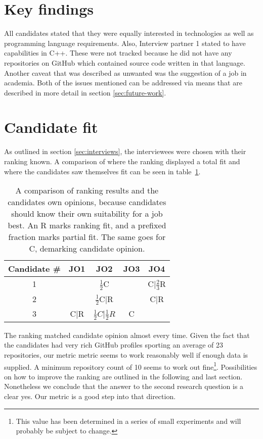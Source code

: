 \section{Key findings}\label{sec:key-findings}
All candidates stated that they were equally interested in technologies as well as programming language requirements. Also, Interview partner 1 stated to have capabilities in C++. These were not tracked because he did not have any repositories on GitHub which contained source code written in that language. Another caveat that was described as unwanted was the suggestion of a job in academia. Both of the issues mentioned can be addressed via means that are described in more detail in section \ref{sec:future-work}.

\section{Candidate fit}
As outlined in section \ref{sec:interviews}, the interviewees were chosen with their ranking known. A comparison of where the ranking displayed a total fit and where the candidates saw themselves fit can be seen in table~\ref{table:rank-comparison}.

\begin{table}
\centering
\begin{tabular}{c|cccc}
Candidate \# & JO1 & JO2 & JO3 & JO4\\
\hline
           1 & & $\frac{1}{2}$C & & C|$\frac{2}{3}$R\\
           2 & & $\frac{1}{2}$C|R & & C|R\\
           3 & C|R & $\frac{1}{2}C$|$\frac{1}{2}R$ & C & \\
\end{tabular}
\caption{A comparison of ranking results and the candidates own opinions, because candidates should know their own suitability for a job best. An R marks ranking fit, and a prefixed fraction marks partial fit. The same goes for C, demarking candidate opinion.}
\label{table:rank-comparison}
\end{table}

The ranking matched candidate opinion almost every time. Given the fact that the candidates had very rich GitHub profiles sporting an average of 23 repositories, our metric metric seems to work reasonably well if enough data is supplied. A minimum repository count of 10 seems to work out fine\footnote{This value has been determined in a series of small experiments and will probably be subject to change.}. Possibilities on how to improve the ranking are outlined in the following and last section. Nonetheless we conclude that the answer to the second research question is a clear yes. Our metric is a good step into that direction.